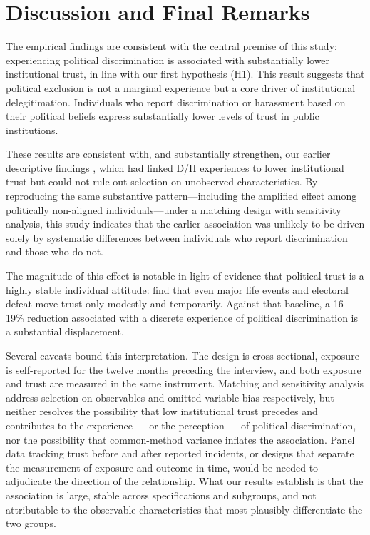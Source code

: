 \documentclass{article}
\begin{document}
\section{Discussion and Final Remarks}

The empirical findings are consistent with the central premise of this study: experiencing political discrimination is associated with substantially lower institutional trust, in line with our first hypothesis (H1). This result suggests that political exclusion is not a marginal experience but a core driver of institutional delegitimation. Individuals who report discrimination or harassment based on their political beliefs express substantially lower levels of trust in public institutions.

These results are consistent with, and substantially strengthen, our earlier descriptive findings \parencite{montoya2025trustbreakers}, which had linked D/H experiences to lower institutional trust but could not rule out selection on unobserved characteristics. By reproducing the same substantive pattern—including the amplified effect among politically non-aligned individuals—under a matching design with sensitivity analysis, this study indicates that the earlier association was unlikely to be driven solely by systematic differences between individuals who report discrimination and those who do not.

The magnitude of this effect is notable in light of evidence that political trust is a highly stable individual attitude: \textcite{devine_stability_2024} find that even major life events and electoral defeat move trust only modestly and temporarily. Against that baseline, a 16–19\% reduction associated with a discrete experience of political discrimination is a substantial displacement.

Several caveats bound this interpretation. The design is cross-sectional, exposure is self-reported for the twelve months preceding the interview, and both exposure and trust are measured in the same instrument. Matching and sensitivity analysis address selection on observables and omitted-variable bias respectively, but neither resolves the possibility that low institutional trust precedes and contributes to the experience — or the perception — of political discrimination, nor the possibility that common-method variance inflates the association. Panel data tracking trust before and after reported incidents, or designs that separate the measurement of exposure and outcome in time, would be needed to adjudicate the direction of the relationship. What our results establish is that the association is large, stable across specifications and subgroups, and not attributable to the observable characteristics that most plausibly differentiate the two groups.
\end{document}
